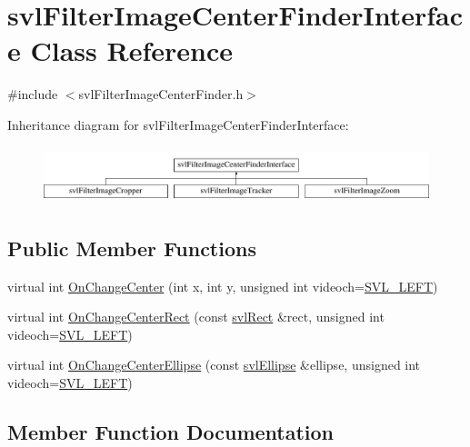 \hypertarget{classsvl_filter_image_center_finder_interface}{}\section{svl\+Filter\+Image\+Center\+Finder\+Interface Class Reference}
\label{classsvl_filter_image_center_finder_interface}


{\ttfamily \#include $<$svl\+Filter\+Image\+Center\+Finder.\+h$>$}

Inheritance diagram for svl\+Filter\+Image\+Center\+Finder\+Interface\+:\begin{figure}[H]
\begin{center}
\leavevmode
\includegraphics[height=1.674140cm]{da/d50/classsvl_filter_image_center_finder_interface}
\end{center}
\end{figure}
\subsection*{Public Member Functions}
\begin{DoxyCompactItemize}
\item 
virtual int \hyperlink{classsvl_filter_image_center_finder_interface_a1033c4b107100b8cb6565922442db2f1}{On\+Change\+Center} (int x, int y, unsigned int videoch=\hyperlink{svl_definitions_8h_ab9fec7615f19c8df2919eebcab0b187f}{S\+V\+L\+\_\+\+L\+E\+F\+T})
\item 
virtual int \hyperlink{classsvl_filter_image_center_finder_interface_a8c8d6d68ad9180bd9480c2575b668b5c}{On\+Change\+Center\+Rect} (const \hyperlink{structsvl_rect}{svl\+Rect} \&rect, unsigned int videoch=\hyperlink{svl_definitions_8h_ab9fec7615f19c8df2919eebcab0b187f}{S\+V\+L\+\_\+\+L\+E\+F\+T})
\item 
virtual int \hyperlink{classsvl_filter_image_center_finder_interface_aab0f7f23286f56bee292581c40e28c6d}{On\+Change\+Center\+Ellipse} (const \hyperlink{structsvl_ellipse}{svl\+Ellipse} \&ellipse, unsigned int videoch=\hyperlink{svl_definitions_8h_ab9fec7615f19c8df2919eebcab0b187f}{S\+V\+L\+\_\+\+L\+E\+F\+T})
\end{DoxyCompactItemize}


\subsection{Member Function Documentation}
\hypertarget{classsvl_filter_image_center_finder_interface_a1033c4b107100b8cb6565922442db2f1}{}

